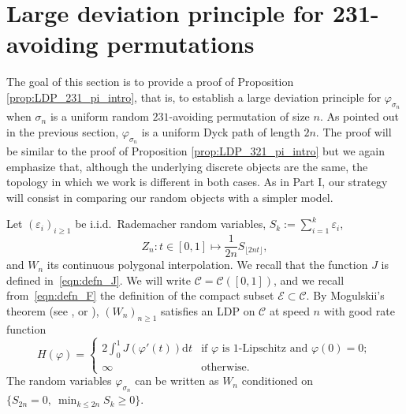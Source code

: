 \documentclass[a4paper,11pt]{amsart}
\newcommand{\eps}{\varepsilon}
\newtheorem{prop}[thm]{Proposition}
\theoremstyle{definition}
\begin{document}
\section{Large deviation principle for 231-avoiding permutations}

The goal of this section is to provide a proof of Proposition \ref{prop:LDP_231_pi_intro}, that is, to establish a large deviation principle for $\varphi_{\sigma_n}$ when $\sigma_n$ is a uniform random $231$-avoiding permutation of size $n$.
As pointed out in the previous section, $\varphi_{\sigma_n}$ is a uniform Dyck path of length $2n.$ 
The proof will be similar to the proof of Proposition \ref{prop:LDP_321_pi_intro} but we again emphasize that, although the underlying discrete objects are the same, the topology in which we work is different in both cases. 
As in Part I, our strategy will consist in comparing our random objects with a simpler model.

%
%
    Let $(\eps_i)_{i \ge 1}$ be i.i.d.~Rademacher random variables, $S_k := \sum_{i=1}^k \eps_i$,
    \[
        Z_n : t \in [0,1] \mapsto \frac{1}{2n} S_{\lfloor 2nt \rfloor},
    \]
    and $W_n$ its continuous polygonal interpolation. We recall that the function $J$ is defined in~\eqref{eqn:defn_J}. We will write $\mathcal{C}=\mathcal{C}([0,1])$, and we recall from~\eqref{eqn:defn_F} the definition of the compact subset $\mathcal{E} \subset \mathcal{C}$. By Mogulskii's theorem (see \cite{mogulskij1976LDP_Random_Walks}, or \cite[Theorem 5.1.2]{dembo1998large-deviations}), $(W_n)_{n \ge 1}$ satisfies an LDP on $\mathcal{C}$ at speed $n$ with good rate function
    \[
        H(\varphi) =
        \begin{cases}
            2 \int_0^1 J(\varphi'(t)) \mathrm{d}t & \text{if $\varphi$ is 1-Lipschitz and } \varphi(0)=0;\\
            \infty & \text{otherwise.}
        \end{cases}
    \]
   The random variables $\varphi_{\sigma_n}$ can be written as $W_n$ conditioned on $\{S_{2n}=0,\ \min_{k \le 2n} S_k \ge 0\}$.
\end{document}

